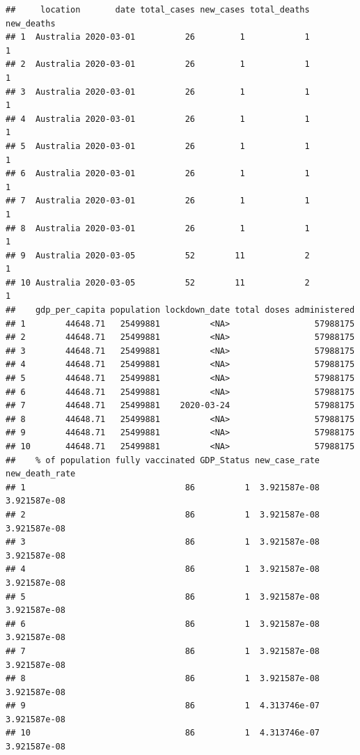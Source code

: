 \documentclass[
]{article}
\begin{document}
\begin{verbatim}
##     location       date total_cases new_cases total_deaths new_deaths
## 1  Australia 2020-03-01          26         1            1          1
## 2  Australia 2020-03-01          26         1            1          1
## 3  Australia 2020-03-01          26         1            1          1
## 4  Australia 2020-03-01          26         1            1          1
## 5  Australia 2020-03-01          26         1            1          1
## 6  Australia 2020-03-01          26         1            1          1
## 7  Australia 2020-03-01          26         1            1          1
## 8  Australia 2020-03-01          26         1            1          1
## 9  Australia 2020-03-05          52        11            2          1
## 10 Australia 2020-03-05          52        11            2          1
##    gdp_per_capita population lockdown_date total doses administered
## 1        44648.71   25499881          <NA>                 57988175
## 2        44648.71   25499881          <NA>                 57988175
## 3        44648.71   25499881          <NA>                 57988175
## 4        44648.71   25499881          <NA>                 57988175
## 5        44648.71   25499881          <NA>                 57988175
## 6        44648.71   25499881          <NA>                 57988175
## 7        44648.71   25499881    2020-03-24                 57988175
## 8        44648.71   25499881          <NA>                 57988175
## 9        44648.71   25499881          <NA>                 57988175
## 10       44648.71   25499881          <NA>                 57988175
##    % of population fully vaccinated GDP_Status new_case_rate new_death_rate
## 1                                86          1  3.921587e-08   3.921587e-08
## 2                                86          1  3.921587e-08   3.921587e-08
## 3                                86          1  3.921587e-08   3.921587e-08
## 4                                86          1  3.921587e-08   3.921587e-08
## 5                                86          1  3.921587e-08   3.921587e-08
## 6                                86          1  3.921587e-08   3.921587e-08
## 7                                86          1  3.921587e-08   3.921587e-08
## 8                                86          1  3.921587e-08   3.921587e-08
## 9                                86          1  4.313746e-07   3.921587e-08
## 10                               86          1  4.313746e-07   3.921587e-08
\end{verbatim}
\end{document}
